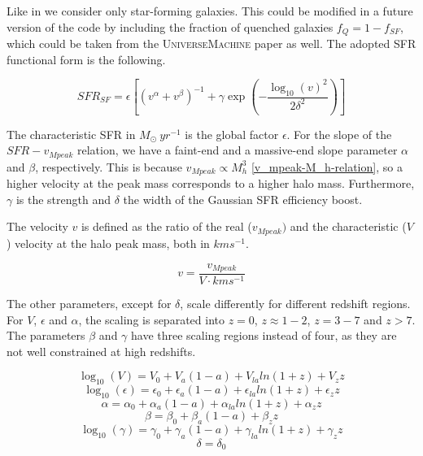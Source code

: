 Like in \cite{dallarmi_dipole_2022} we consider only star-forming galaxies. This could be modified in a future version of the code by including the fraction of quenched galaxies $f_Q = 1 -f_{SF}$, which could be taken from the \textsc{UniverseMachine} paper as well. The adopted SFR functional form is the following.

\begin{equation}
    SFR_{SF} = \epsilon \left[ \left( v^\alpha + v^\beta \right)^{-1} + \gamma \exp \left(-\frac{\log_{10}(v)^2}{2\delta^2}\right) \right]
\end{equation}

The characteristic SFR  in $M_\odot\ yr^{-1}$ is the global factor $\epsilon$. For the slope of the $SFR-v_{Mpeak}$ relation, we have a faint-end and a massive-end slope parameter $\alpha$ and $\beta$, respectively. This is because $v_{Mpeak} \propto M_h^3$ \ref{v_mpeak-M_h-relation}, so a higher velocity at the peak mass corresponds to a higher halo mass.
Furthermore, $\gamma$ is the strength and $\delta$ the width of the Gaussian SFR efficiency boost. 

The velocity $v$ is defined as the ratio of the real ($v_{Mpeak})$ and the characteristic ($V$) velocity at the halo peak mass, both in $km s^{-1}$.

\begin{equation}
    v = \frac{v_{Mpeak}}{V \cdot km s^{-1}}
\end{equation}

The other parameters, except for $\delta$, scale differently for different redshift regions. For $V$, $\epsilon$ and $\alpha$, the scaling is separated into $z=0$, $z\approx 1-2$, $z=3-7$ and $z>7$. The parameters $\beta$ and $\gamma$ have three scaling regions instead of four, as they are not well constrained at high redshifts. 

\begin{equation}
    \log_{10}(V) = V_0 + V_a(1-a)+V_{la}ln(1+z)+V_z z
\end{equation}
\begin{equation}
    \log_{10}(\epsilon) = \epsilon_0 + \epsilon_a(1-a)+\epsilon_{la}ln(1+z)+\epsilon_z z
\end{equation}
\begin{equation}
    \alpha = \alpha_0 + \alpha_a(1-a)+\alpha_{la}ln(1+z)+\alpha_z z
\end{equation}
\begin{equation}
    \beta = \beta_0 + \beta_a(1-a)+\beta_z z
\end{equation}
\begin{equation}
    \log_{10}(\gamma) = \gamma_0 + \gamma_a(1-a)+\gamma_{la}ln(1+z)+\gamma_z z
\end{equation}
\begin{equation}
    \delta = \delta_0
\end{equation}

